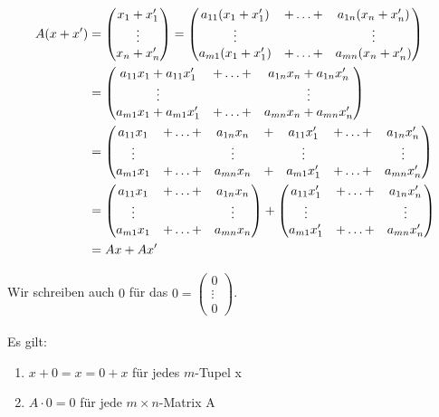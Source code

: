 \begin{align*}
 A(x+x') &= 
\begin{pmatrix}
x_1  +  x'_1 \\
\vdots \\
x_n + x'_n \\
\end{pmatrix} =
\begin{pmatrix}
a_{11}(x_1 + x'_1) & +  \ldots  + & a_{1n}(x_n + x'_n) \\
\vdots &  & \vdots \\
a_{m1}(x_1 + x'_1) & +  \ldots  + & a_{mn}(x_n + x'_n) 
\end{pmatrix} 
\\
&= 
\begin{pmatrix}
a_{11} x_1  +  a_{11} x'_1 & +  \ldots  + & a_{1n} x_n + a_{1n} x'_n\\
\vdots &   &   \vdots  \\
a_{m1} x_1  +  a_{m1} x'_1 & +  \ldots  + & a_{mn} x_n + a_{mn} x'_n
\end{pmatrix} \\
&=
\setcounter{MaxMatrixCols}{12}
\begin{pmatrix}
a_{11} x_1 & +  \ldots  + & a_{1n} x_n & + & a_{11}x'_1 & +  \ldots  + & a_{1n}x'_n\\
\vdots &  & \vdots & & \vdots &  & \vdots \\
a_{m1} x_1 & +  \ldots  + & a_{mn} x_n & + & a_{m1}x'_1 & +  \ldots  + & a_{mn}x'_n
\end{pmatrix} \\
&=
\begin{pmatrix}
a_{11} x_1 & +  \ldots  + & a_{1n} x_n \\
\vdots &  & \vdots \\
a_{m1} x_1 & +  \ldots  + & a_{mn} x_n 
\end{pmatrix}
+
\begin{pmatrix}
a_{11}x'_1 & +  \ldots  + & a_{1n}x'_n\\
\vdots &  & \vdots  \\
a_{m1}x'_1 & +  \ldots  + & a_{mn}x'_n
\end{pmatrix} \\
&=
Ax + Ax'
\end{align*}

Wir schreiben auch \(0\) für das   \enspace \(0= \begin{pmatrix} 0 \\ \vdots \\ 0 \end{pmatrix} \). \\ \\
Es gilt:
\begin{enumerate}
\item 
\( x+0=x=0+x \) für jedes \(m\)-Tupel x
\item 
\(A\cdot 0=0\) für jede \(m \times n\)-Matrix A
\end{enumerate} 


